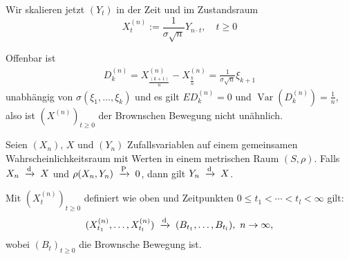 \documentclass[a4paper,twoside,DIV15,BCOR12mm]{scrbook}
\begin{document}
Wir skalieren jetzt $(Y_t)$ in der Zeit und im Zustandsraum
\[
X_t^{(n)}:=\frac{1}{\sigma\sqrt{n}}Y_{n\cdot t},\quad t\geq0
\]

\begin{bemerkung}
Offenbar ist
\begin{align*}
D_k^{(n)} = X_{\frac{(k+1)}n}^{(n)} - X_{\frac kn}^{(n)}
= \frac 1 {\sigma\sqrt n} \xi_{k+1}
\end{align*}
unabhängig von $\sigma(\xi_1,\ldots,\xi_k)$ und es gilt $ED_k^{(n)} = 0$ und $\operatorname{Var}(D_k^{(n)}) = \frac 1n$, also ist $(X^{(n)})_{t\ge 0}$ der Brownschen Bewegung nicht unähnlich.
\end{bemerkung}

\begin{lemma}
Seien $(X_n)$, $X$ und $(Y_n)$ Zufallsvariablen auf einem gemeinsamen Wahrscheinlichkeitsraum mit Werten in einem metrischen Raum $(S,\rho)$. Falls $X_n \tonach{d} X$ und $\rho(X_n,Y_n)\tonach{P} 0$, dann gilt $Y_n \tonach{d} X$.
\label{lemma:14.1}
\end{lemma}

\begin{satz}
\label{satz:14.2}Mit $(X^{(n)}_t)_{t\ge0}$ definiert wie oben und Zeitpunkten $0\le t_1<\cdots<t_l<\infty$ gilt:
\begin{align*}
(X_{t_1}^{(n)},\ldots,X_{t_l}^{(n)}) \tonach{d} (B_{t_1},\ldots,B_{t_l}),\ n\to \infty,
\end{align*}
wobei $(B_t)_{t\ge 0}$ die Brownsche Bewegung ist.
\end{satz}
\end{document}
